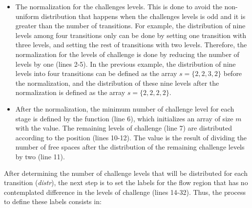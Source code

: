 \begin{itemize}
\item
The normalization for the challenges levels.
This is done to avoid the non-uniform distribution that happens when the challenges levels is odd and it is greater than the number of transitions.
For example, the distribution of nine levels among four transitions only can be done by setting one transition with three levels, and setting the rest of transitions with two levels.
Therefore, the normalization for the levels of challenge is done by reducing the number of levels by one (lines 2-5).
In the previous example, the distribution of nine levels into four transitions can be defined as the array $s = \{2, 2, 3, 2\}$ before the normalization, and the distribution of these nine levels after the normalization is defined as the array $s = \{2, 2, 2, 2\}$.
\item
After the normalization, the minimum number of challenge level for each stage is defined by the function  (line 6), which initializes an array of size $m$ with the value.
The remaining levels of challenge (line 7) are distributed according to the position  (lines 10-12).
The value  is the result of dividing the number of free spaces after the distribution of the remaining challenge levels by two (line 11).
\end{itemize}

After determining the number of challenge levels that will be distributed for each transition (\emph{distr}), the next step is to set the labels for the flow region that has no contemplated difference in the levels of challenge (lines 14-32).
Thus, the process to define these labels consists in:

